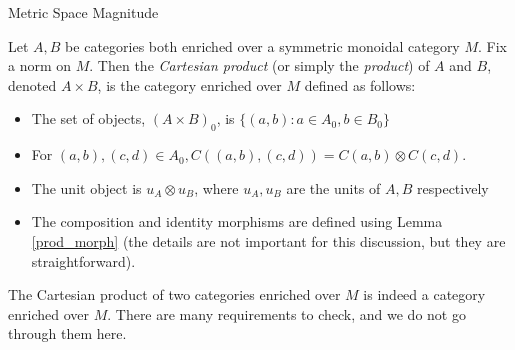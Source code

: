 \documentclass[12pt]{pom_thesis}
\begin{document}
\begin{chapter}{Metric Space Magnitude}
\begin{defn}

Let $A,B$ be categories both enriched over a symmetric monoidal category $M$. Fix a norm on $M$. Then the \emph{Cartesian product} (or simply the \emph{product}) of $A$ and $B$, denoted $A \times B$, is the category enriched over $M$ defined as follows:
\begin{itemize}
\item The set of objects, $(A \times B)_0$, is $\{(a,b):a \in A_0, b \in  B_0\}$
\item For $(a,b), (c,d) \in A_0, C((a,b), (c,d)) = C(a,b) \otimes C(c,d)$.
\item The unit object is $u_A \otimes u_B$, where $u_A, u_B$ are the units of $A,B$ respectively
\item The composition and identity morphisms are defined using Lemma \ref{prod_morph} (the details are not important for this discussion, but they are straightforward).
\end{itemize}
\begin{rmk}
The Cartesian product of two categories enriched over $M$ is indeed a category enriched over $M$. There are many requirements to check, and we do not go through them here.
\end{rmk}
\end{defn}


\end{chapter}
\end{document}

